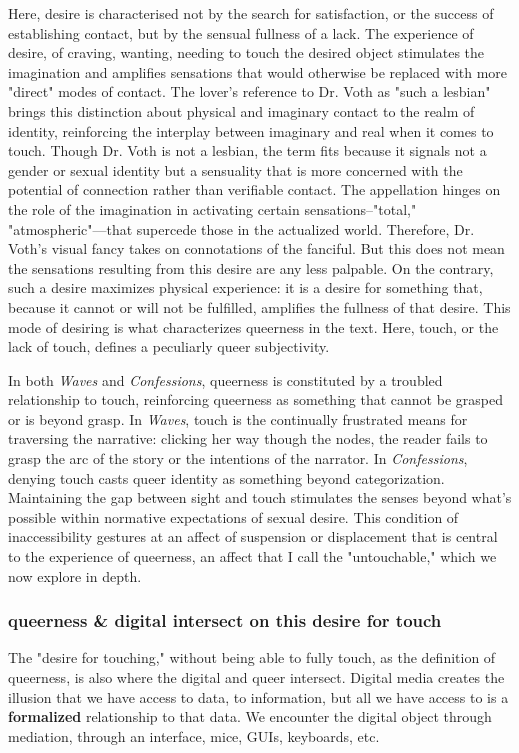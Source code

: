 \documentclass[11pt]{article}
\begin{document}
Here, desire is characterised not by the search for satisfaction, or
the success of establishing contact, but by the sensual fullness of a
lack. The experience of desire, of craving, wanting, needing to touch
the desired object stimulates the imagination and amplifies sensations
that would otherwise be replaced with more "direct" modes of
contact. The lover's reference to Dr. Voth as "such a lesbian" brings
this distinction about physical and imaginary contact to the realm of
identity, reinforcing the interplay between imaginary and real when it
comes to touch. Though Dr. Voth is not a lesbian, the term fits
because it signals not a gender or sexual identity but a sensuality
that is more concerned with the potential of connection rather than
verifiable contact. The appellation hinges on the role of the
imagination in activating certain sensations--"total,"
"atmospheric"---that supercede those in the actualized
world. Therefore, Dr. Voth's visual fancy takes on connotations of the
fanciful. But this does not mean the sensations resulting from this
desire are any less palpable. On the contrary, such a desire maximizes
physical experience: it is a desire for something that, because it
cannot or will not be fulfilled, amplifies the fullness of that
desire. This mode of desiring is what characterizes queerness in the
text. Here, touch, or the lack of touch, defines a peculiarly queer
subjectivity.

In both \emph{Waves} and \emph{Confessions}, queerness is constituted by a
troubled relationship to touch, reinforcing queerness as something
that cannot be grasped or is beyond grasp. In \emph{Waves}, touch is the
continually frustrated means for traversing the narrative: clicking
her way though the nodes, the reader fails to grasp the arc of the
story or the intentions of the narrator. In \emph{Confessions}, denying
touch casts queer identity as something beyond
categorization. Maintaining the gap between sight and touch stimulates
the senses beyond what's possible within normative expectations of
sexual desire. This condition of inaccessibility gestures at an affect
of suspension or displacement that is central to the experience of
queerness, an affect that I call the "untouchable," which we now
explore in depth.

\subsubsection{queerness \& digital intersect on this desire for touch}
\label{sec:org332035b}
The "desire for touching," without being able to fully touch, as the
definition of queerness, is also where the digital and queer
intersect. Digital media creates the illusion that we have access to
data, to information, but all we have access to is a \textbf{formalized}
relationship to that data. We encounter the digital object through
mediation, through an interface, mice, GUIs, keyboards, etc.
\end{document}
